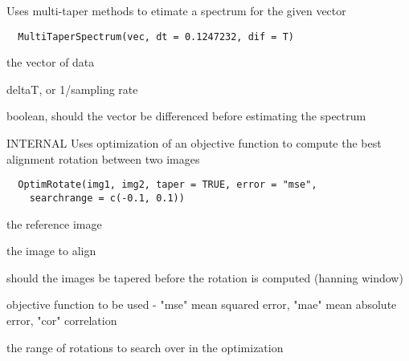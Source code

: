 \documentclass[a4paper]{book}
\begin{document}
%
\begin{Description}\relax
Uses multi-taper methods to etimate a spectrum for the
given vector
\end{Description}
%
\begin{Usage}
\begin{verbatim}
  MultiTaperSpectrum(vec, dt = 0.1247232, dif = T)
\end{verbatim}
\end{Usage}
%
\begin{Arguments}
\begin{ldescription}
\item[\code{vec}] the vector of data

\item[\code{dt}] deltaT, or 1/sampling rate

\item[\code{dif}] boolean, should the vector be differenced
before estimating the spectrum
\end{ldescription}
\end{Arguments}
%
\begin{Description}\relax
INTERNAL Uses optimization of an objective function to
compute the best alignment rotation between two images
\end{Description}
%
\begin{Usage}
\begin{verbatim}
  OptimRotate(img1, img2, taper = TRUE, error = "mse",
    searchrange = c(-0.1, 0.1))
\end{verbatim}
\end{Usage}
%
\begin{Arguments}
\begin{ldescription}
\item[\code{img1}] the reference image

\item[\code{img2}] the image to align

\item[\code{taper}] should the images be tapered before the
rotation is computed (hanning window)

\item[\code{error}] objective function to be used - "mse" mean
squared error, "mae" mean absolute error, "cor"
correlation

\item[\code{searchrange}] the range of rotations to search over
in the optimization
\end{ldescription}
\end{Arguments}
\end{document}
